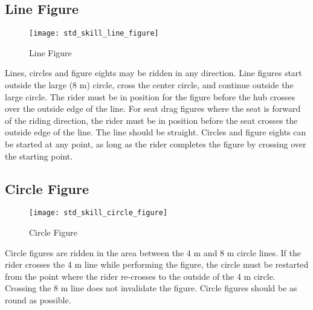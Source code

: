 \subsection{Line Figure}
\begin{wrapfigure}{r}{0.35\textwidth}
\vspace{-35pt}
\begin{center}
\texttt{[image: std\_skill\_line\_figure]}
\end{center}
\vspace{-20pt}
\caption{Line Figure\label{fig:std_skill_line_figure}}
\vspace{-10pt}
\end{wrapfigure}
Lines, circles and figure eights may be ridden in any direction.
Line figures start outside the large (8 m) circle, cross the center circle, and continue outside the large circle.
The rider must be in position for the figure before the hub crosses over the outside edge of the line.
For seat drag figures where the seat is forward of the riding direction, the rider must be in position before the seat crosses the outside edge of the line.
The line should be straight.
Circles and figure eights can be started at any point, as long as the rider completes the figure by crossing over the starting point.

\subsection{Circle Figure}
\begin{wrapfigure}{r}{0.35\textwidth}
\vspace{-75pt}
\begin{center}
\texttt{[image: std\_skill\_circle\_figure]}
\end{center}
\vspace{-20pt}
\caption{Circle Figure\label{fig:std_skill_circle_figure}}
\vspace{-10pt}
\end{wrapfigure}
Circle figures are ridden in the area between the 4 m and 8 m circle lines.
If the rider crosses the 4 m line while performing the figure, the circle must be restarted from the point where the rider re-crosses to the outside of the 4 m circle.
Crossing the 8 m line does not invalidate the figure.
Circle figures should be as round as possible.

